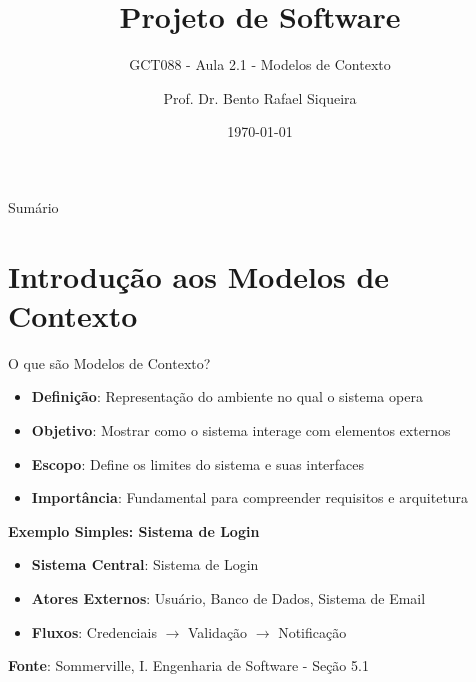 \documentclass[aspectratio=169]{beamer}
\title{Projeto de Software}
\subtitle{GCT088 - Aula 2.1 - Modelos de Contexto}
\author{Prof. Dr. Bento Rafael Siqueira}
\institute{Universidade Federal de Lavras\\Departamento de Ciência da Computação}
\date{\today}
\begin{document}
\begin{frame}
\titlepage
\end{frame}

\begin{frame}{Sumário}
\tableofcontents
\end{frame}

\section{Introdução aos Modelos de Contexto}

\begin{frame}{O que são Modelos de Contexto?}
\begin{itemize}
\item \textbf{Definição}: Representação do ambiente no qual o sistema opera
\item \textbf{Objetivo}: Mostrar como o sistema interage com elementos externos
\item \textbf{Escopo}: Define os limites do sistema e suas interfaces
\item \textbf{Importância}: Fundamental para compreender requisitos e arquitetura
\end{itemize}

\vspace{0.5cm}
\textbf{Exemplo Simples: Sistema de Login}
\begin{itemize}
\item \textbf{Sistema Central}: Sistema de Login
\item \textbf{Atores Externos}: Usuário, Banco de Dados, Sistema de Email
\item \textbf{Fluxos}: Credenciais $\rightarrow$ Validação $\rightarrow$ Notificação
\end{itemize}

\vspace{0.3cm}
\textbf{Fonte}: Sommerville, I. Engenharia de Software - Seção 5.1
\end{frame}
\end{document}
